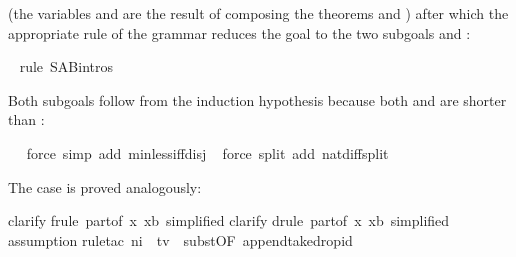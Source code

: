 \begin{isabellebody}
%
\begin{isamarkuptxt}%
\noindent
(the variables  and  are the result of composing the
theorems  and )
after which the appropriate rule of the grammar reduces the goal
to the two subgoals  and :%
\end{isamarkuptxt}%
\ \isamarkuptrue%
rule\ S{\isacharunderscore}A{\isacharunderscore}B{\isachardot}intros{\isacharparenright}\isamarkupfalse%
%
\begin{isamarkuptxt}%
Both subgoals follow from the induction hypothesis because both  and  are shorter than :%
\end{isamarkuptxt}%
\ \ \isamarkuptrue%
force\ simp\ add{\isacharcolon}\ min{\isacharunderscore}less{\isacharunderscore}iff{\isacharunderscore}disj{\isacharparenright}\isanewline
\ \isamarkupfalse%
force\ split\ add{\isacharcolon}\ nat{\isacharunderscore}diff{\isacharunderscore}split{\isacharparenright}\isamarkupfalse%
%
\begin{isamarkuptxt}%
The case  is proved analogously:%
\end{isamarkuptxt}%
\isamarkuptrue%
clarify{\isacharparenright}\isanewline
\isamarkupfalse%
frule\ part{}{\isacharbrackleft}of\ {\isachardoublequote}{\isasymlambda}x{\isachardot}\ x{\isacharequal}b{\isachardoublequote}{\isacharcomma}\ simplified{\isacharbrackright}{\isacharparenright}\isanewline
\isamarkupfalse%
clarify{\isacharparenright}\isanewline
\isamarkupfalse%
drule\ part{}{\isacharbrackleft}of\ {\isachardoublequote}{\isasymlambda}x{\isachardot}\ x{\isacharequal}b{\isachardoublequote}{\isacharcomma}\ simplified{\isacharbrackright}{\isacharparenright}\isanewline
\ \isamarkupfalse%
assumption{\isacharparenright}\isanewline
\isamarkupfalse%
rule{\isacharunderscore}tac\ n{}{\isacharequal}i\ \ t{\isacharequal}v\ \ subst{\isacharbrackleft}OF\ append{\isacharunderscore}take{\isacharunderscore}drop{\isacharunderscore}id{\isacharbrackright}{\isacharparenright}\isanewline

\end{isabellebody}
